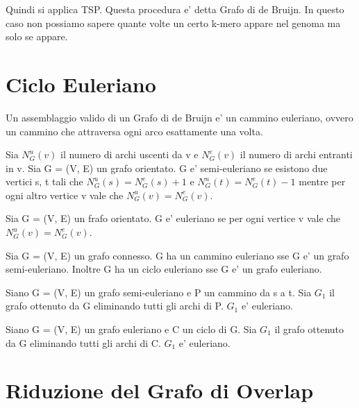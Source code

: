 Quindi si applica TSP. Questa procedura e' detta Grafo di de Bruijn.
In questo caso non possiamo sapere quante volte un certo k-mero appare nel genoma ma solo se appare.


\section{Ciclo Euleriano}

Un assemblaggio valido di un Grafo di de Bruijn e' un cammino euleriano, ovvero un cammino che attraversa ogni arco esattamente una volta.

Sia $N^u_G(v)$ il numero di archi uscenti da v e $N^e_G(v)$ il numero di archi entranti in v.
Sia G = (V, E) un grafo orientato. G e' semi-euleriano se esistono due vertici s, t tali che
$N^u_G(s) = N^e_G(s) + 1$ e $N^u_G(t) = N^e_G(t) - 1$ mentre per ogni altro vertice v vale che $N^u_G(v) = N^e_G(v)$.

Sia G = (V, E) un frafo orientato. G e' euleriano se per ogni vertice v vale che $N^u_G(v) = N^e_G(v)$.

Sia G = (V, E) un grafo connesso. G ha un cammino euleriano sse G e' un grafo semi-euleriano.
Inoltre G ha un ciclo euleriano sse G e' un grafo euleriano.

Siano G = (V, E) un grafo semi-euleriano e P un cammino da s a t.
Sia $G_1$ il grafo ottenuto da G eliminando tutti gli archi di P. $G_1$ e' euleriano.

Siano G = (V, E) un grafo euleriano e C un ciclo di G. Sia $G_1$ il grafo ottenuto da G eliminando tutti gli archi di C. $G_1$ e' euleriano.

\section{Riduzione del Grafo di Overlap}

